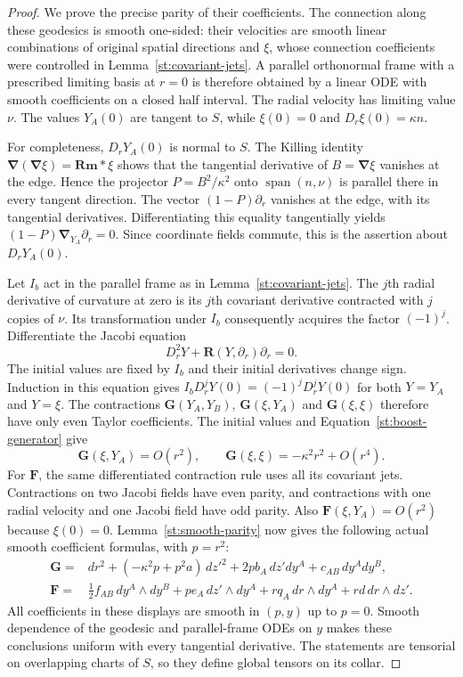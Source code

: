 \begin{proof}
We prove the precise parity of their coefficients.  The connection
along these geodesics is smooth one-sided: their velocities are
smooth linear combinations of original spatial directions and
$\xi$, whose connection coefficients were controlled in
Lemma~\ref{st:covariant-jets}.  A parallel orthonormal frame with a
prescribed limiting basis at $r=0$ is therefore obtained by a linear
ODE with smooth coefficients on a closed half interval.  The radial
velocity has limiting value $\nu$.  The values $Y_A(0)$ are tangent
to $S$, while $\xi(0)=0$ and
$D_r\xi(0)=\kappa n$.

For completeness, $D_rY_A(0)$ is normal to $S$.  The Killing identity
$\boldsymbol\nabla(\boldsymbol\nabla\xi)=\mathbf{Rm}*\xi$
shows that the tangential derivative of $B=\boldsymbol\nabla\xi$
vanishes at the edge.  Hence the projector
$P=B^2/\kappa^2$ onto $\operatorname{span}(n,\nu)$ is parallel
there in every tangent direction.  The vector $(1-P)\partial_r$
vanishes at the edge, with its tangential derivatives.  Differentiating
this equality tangentially yields
$(1-P)\boldsymbol\nabla_{Y_A}\partial_r=0$.  Since coordinate
fields commute, this is the assertion about $D_rY_A(0)$.

Let $I_b$ act in the parallel frame as in
Lemma~\ref{st:covariant-jets}.  The $j$th radial derivative of
curvature at zero is its $j$th covariant derivative contracted with
$j$ copies of $\nu$.  Its transformation under $I_b$ consequently
acquires the factor $(-1)^j$.  Differentiate the Jacobi equation
\[
 D_r^2Y+\mathbf R(Y,\partial_r)\partial_r=0.
\]
The initial values are fixed by $I_b$ and their initial derivatives
change sign.  Induction in this equation gives
$I_b D_r^jY(0)=(-1)^jD_r^jY(0)$ for both $Y=Y_A$ and $Y=\xi$.
The contractions $\mathbf G(Y_A,Y_B)$,
$\mathbf G(\xi,Y_A)$ and $\mathbf G(\xi,\xi)$ therefore have
only even Taylor coefficients.  The initial values and
Equation~\eqref{st:boost-generator} give
\[
 \mathbf G(\xi,Y_A)=O(r^2),\qquad
 \mathbf G(\xi,\xi)=-\kappa^2r^2+O(r^4).
\]
For $\mathbf F$, the same differentiated contraction rule uses all
its covariant jets.  Contractions on two Jacobi fields have even
parity, and contractions with one radial velocity and one Jacobi
field have odd parity.  Also $\mathbf F(\xi,Y_A)=O(r^2)$ because
$\xi(0)=0$.  Lemma~\ref{st:smooth-parity} now gives the following
actual smooth coefficient formulas, with $p=r^2$:
\begin{align}
 \mathbf G={}&dr^2+(-\kappa^2p+p^2a)\,dz'^2
       +2p b_A\,dz' dy^A+c_{AB}\,dy^A dy^B,\label{st:even-metric}\\
 \mathbf F={}&\tfrac12 f_{AB}\,dy^A\wedge dy^B
       +p e_A\,dz'\wedge dy^A+r q_A\,dr\wedge dy^A
       +r d\,dr\wedge dz'.\label{st:even-maxwell}
\end{align}
All coefficients in these displays are smooth in $(p,y)$ up to
$p=0$.  Smooth dependence of the geodesic and parallel-frame ODEs
on $y$ makes these conclusions uniform with every tangential
derivative.  The statements are tensorial on overlapping charts of
$S$, so they define global tensors on its collar.


\end{proof}
